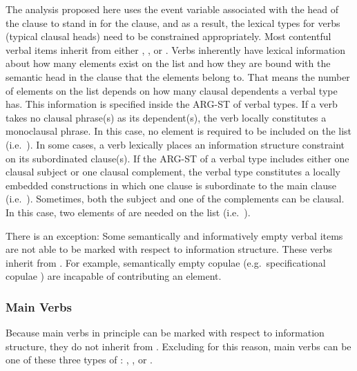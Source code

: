 The analysis proposed here uses the event variable associated with the
head of the clause to stand in for the clause, and as a result, the
lexical types for verbs (typical clausal heads) need to be constrained
appropriately.  Most contentful verbal items inherit from either
, , or
.  Verbs inherently have lexical information
about how many elements exist on the  list and how they are
bound with the semantic head in the clause that the elements belong
to. That means the number of elements on the  list depends
on how many clausal dependents a verbal type has.  This information is
specified inside the ARG-ST of verbal types.  If a verb takes no
clausal phrase(s) as its dependent(s), the verb locally constitutes a
monoclausal phrase. In this case, no element is required to be
included on the  list (i.e.\ ).
In some cases, a verb lexically places an information structure
constraint on its subordinated clause(s).  If the ARG-ST of a verbal
type includes either one clausal subject or one clausal complement,
the verbal type constitutes a locally embedded constructions in which
one clause is subordinate to the main clause
(i.e.\ ). Sometimes, both the subject and one
of the complements can be clausal. In this case, two elements of
 are needed on the  list
(i.e.\ ).



There is an exception: Some semantically and informatively empty
verbal items are not able to be marked with respect to information
structure. These verbs inherit from . For
example, semantically empty copulae (e.g.\ specificational copulae
) are incapable of contributing an 
element.



\subsubsection{Main Verbs}
\label{10:sssec:main-verbs}

Because main verbs in principle can be marked with respect to
information structure, they do not inherit from
. Excluding  for this
reason, main verbs can be one of these three types of
: ,
, or .


